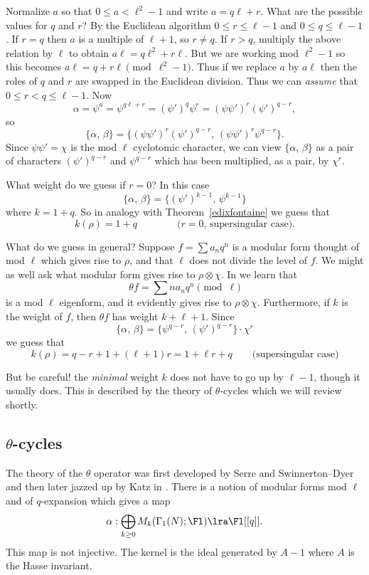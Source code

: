 \documentclass{report}
\begin{document}
Normalize $a$ so that $0\leq a<\ell^2-1$ and write $a=q\ell+r$.
What are the possible values for $q$ and $r$?
By the Euclidean algorithm $0\leq r\leq \ell-1$ and $0\leq q\leq \ell-1$.
If $r=q$ then $a$ is a multiple of $\ell+1$, so $r\neq q$.
If $r>q$, multiply the above relation by $\ell$ to obtain
$a\ell=q\ell^2+r\ell$.  But we are working mod $\ell^2-1$ so
this becomes  $a \ell = q+r\ell\pmod{\ell^2-1}$.
Thus if we replace $a$ by $a\ell$ then the roles of $q$ and $r$ are
swapped in the Euclidean division.
Thus we can {\em assume} that $0\leq r<q\leq \ell-1$.
Now
$$\alpha = \psi^a=\psi^{q\ell+r}=(\psi')^q\psi^r
       =(\psi\psi')^r(\psi')^{q-r},$$
so
$$\{\alpha,\,\beta\}
     =\{(\psi\psi')^r(\psi')^{q-r},\, (\psi\psi')^r\psi^{q-r}\}.$$
Since $\psi\psi'=\chi$ is the mod $\ell$ cyclotomic character,
we can view $\{\alpha,\,\beta\}$ as a pair of characters
$(\psi')^{q-r}$ and $\psi^{q-r}$ which has been multiplied, as a
pair, by $\chi^r$.

What weight do we guess if $r=0$? In this case
$$\{\alpha,\,\beta\}=\{(\psi')^{k-1},\,\psi^{k-1}\}$$
where $k=1+q$. So in analogy with Theorem~\ref{edixfontaine}
we guess that
$$k(\rho)=1+q\qquad\qquad\text{($r=0$, supersingular case)}.$$

What do we guess in general? Suppose $f=\sum a_n q^n$ is a
modular form thought of mod $\ell$ which
gives rise to $\rho$, and that $\ell$ does not
divide the level of $f$.
We might as well ask what modular form gives
rise to $\rho\otimes\chi$.
In \cite{katz:antwerp601} we learn that
$$\theta f=\sum n a_n q^n \pmod{\ell}$$
is a mod $\ell$ eigenform, and it evidently
gives rise to $\rho\otimes\chi$.
Furthermore, if $k$ is the weight of $f$,
then $\theta f$ has weight $k+\ell+1$.
Since
$$\{\alpha,\,\beta\} = \{\psi^{q-r},\, (\psi')^{q-r}\}\cdot\chi^r$$
we guess that
$$k(\rho) = q-r+1+(\ell+1)r=1+\ell{}r+q\qquad\text{(supersingular case)}$$

But be careful! the {\em minimal}
weight $k$ does not have to go up by $\ell-1$, though
it usually does.
This is described by the theory
of $\theta$-cycles which we will review shortly.

\subsection{$\theta$-cycles}
The theory of the $\theta$ operator was first developed
by Serre and  Swinnerton--Dyer and then later jazzed
up by Katz in \cite{katz:antwerp601}.
There is  a notion of modular forms mod $\ell$
and of $q$-expansion which gives a map
$$\alpha:\bigoplus_{k\geq 0}
   M_k(\Gamma_1(N);\Fl)\lra\Fl[[q]].$$
This map is not injective. The kernel is the ideal
generated by $A-1$ where $A$ is the Hasse invariant.
\end{document}

